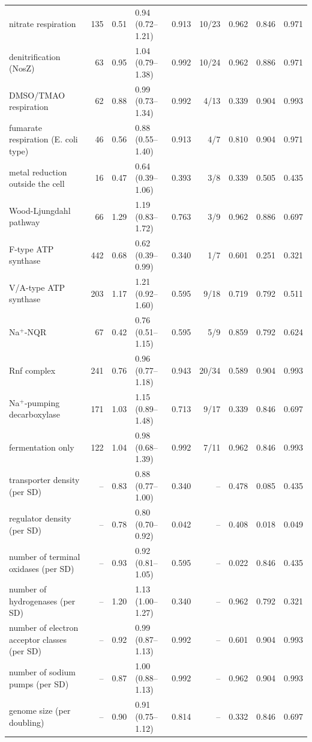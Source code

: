 {\begin{longtable}{p{4.6cm}rrlrrrrr}
nitrate respiration & 135 & 0.51 & 0.94 (0.72--1.21) & 0.913 & 10/23 & 0.962 & 0.846 & 0.971 \\
denitrification (NosZ) & 63 & 0.95 & 1.04 (0.79--1.38) & 0.992 & 10/24 & 0.962 & 0.886 & 0.971 \\
DMSO/TMAO respiration & 62 & 0.88 & 0.99 (0.73--1.34) & 0.992 & 4/13 & 0.339 & 0.904 & 0.993 \\
fumarate respiration (E. coli type) & 46 & 0.56 & 0.88 (0.55--1.40) & 0.913 & 4/7 & 0.810 & 0.904 & 0.971 \\
metal reduction outside the cell & 16 & 0.47 & 0.64 (0.39--1.06) & 0.393 & 3/8 & 0.339 & 0.505 & 0.435 \\
Wood-Ljungdahl pathway & 66 & 1.29 & 1.19 (0.83--1.72) & 0.763 & 3/9 & 0.962 & 0.886 & 0.697 \\
F-type ATP synthase & 442 & 0.68 & 0.62 (0.39--0.99) & 0.340 & 1/7 & 0.601 & 0.251 & 0.321 \\
V/A-type ATP synthase & 203 & 1.17 & 1.21 (0.92--1.60) & 0.595 & 9/18 & 0.719 & 0.792 & 0.511 \\
Na$^+$-NQR & 67 & 0.42 & 0.76 (0.51--1.15) & 0.595 & 5/9 & 0.859 & 0.792 & 0.624 \\
Rnf complex & 241 & 0.76 & 0.96 (0.77--1.18) & 0.943 & 20/34 & 0.589 & 0.904 & 0.993 \\
Na$^+$-pumping decarboxylase & 171 & 1.03 & 1.15 (0.89--1.48) & 0.713 & 9/17 & 0.339 & 0.846 & 0.697 \\
fermentation only & 122 & 1.04 & 0.98 (0.68--1.39) & 0.992 & 7/11 & 0.962 & 0.846 & 0.993 \\
transporter density (per SD) & -- & 0.83 & 0.88 (0.77--1.00) & 0.340 & -- & 0.478 & 0.085 & 0.435 \\
regulator density (per SD) & -- & 0.78 & 0.80 (0.70--0.92) & 0.042 & -- & 0.408 & 0.018 & 0.049 \\
number of terminal oxidases (per SD) & -- & 0.93 & 0.92 (0.81--1.05) & 0.595 & -- & 0.022 & 0.846 & 0.435 \\
number of hydrogenases (per SD) & -- & 1.20 & 1.13 (1.00--1.27) & 0.340 & -- & 0.962 & 0.792 & 0.321 \\
number of electron acceptor classes (per SD) & -- & 0.92 & 0.99 (0.87--1.13) & 0.992 & -- & 0.601 & 0.904 & 0.993 \\
number of sodium pumps (per SD) & -- & 0.87 & 1.00 (0.88--1.13) & 0.992 & -- & 0.962 & 0.904 & 0.993 \\
genome size (per doubling) & -- & 0.90 & 0.91 (0.75--1.12) & 0.814 & -- & 0.332 & 0.846 & 0.697 \\
\bottomrule
\end{longtable}}
